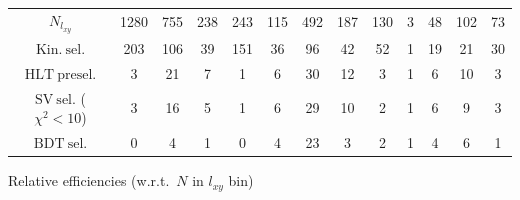 \documentclass[10pt,a4paper]{article}
\begin{document}
\begin{landscape}
{\begin{tabular}{c|cccc|cccc|cccc}
\midrule
$N_{l_{xy}}$ & 1280 & 755 & 238 & 243 & 115 & 492 & 187 & 130 & 3 & 48 & 102 & 73\\
$\mathrm{Kin.\ sel.}$ & 203 & 106 & 39 & 151 & 36 & 96 & 42 & 52 & 1 & 19 & 21 & 30\\
$\mathrm{HLT\ presel.}$ & 3 & 21 & 7 & 1 & 6 & 30 & 12 & 3 & 1 & 6 & 10 & 3\\
$\mathrm{SV\ sel.}$ ($\chi^2{<}10$) & 3 & 16 & 5 & 1 & 6 & 29 & 10 & 2 & 1 & 6 & 9 & 3\\
$\mathrm{BDT\ sel.}$ & 0 & 4 & 1 & 0 & 4 & 23 & 3 & 2 & 1 & 4 & 6 & 1\\
\bottomrule
\end{tabular}}

\vspace{18pt}

Relative efficiencies (w.r.t.\ $N$ in $l_{xy}$ bin)


\end{landscape}
\end{document}
